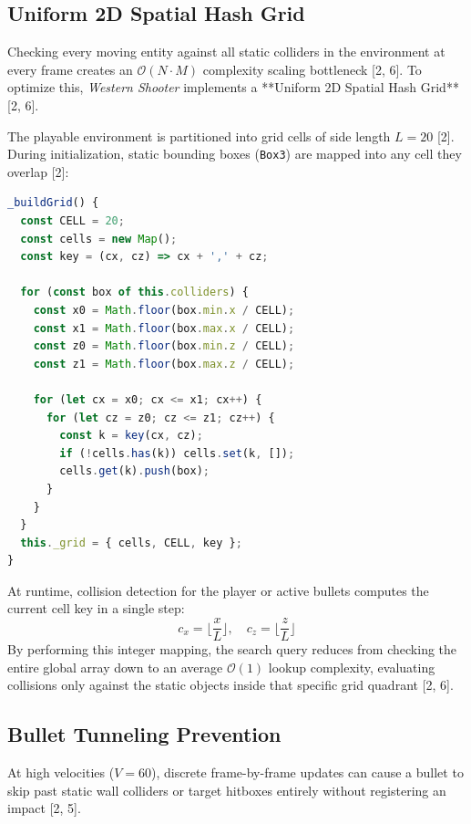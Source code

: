 \documentclass[11pt,a4paper,oneside]{article}
\begin{document}
\subsection{Uniform 2D Spatial Hash Grid}
Checking every moving entity against all static colliders in the environment at every frame creates an $\mathcal{O}(N \cdot M)$ complexity scaling bottleneck [2, 6]. To optimize this, \emph{Western Shooter} implements a **Uniform 2D Spatial Hash Grid** [2, 6].

The playable environment is partitioned into grid cells of side length $L = 20$ [2]. During initialization, static bounding boxes (\texttt{Box3}) are mapped into any cell they overlap [2]:

\begin{lstlisting}[language=JavaScript, caption={Building the grid partition}]
_buildGrid() {
  const CELL = 20;
  const cells = new Map();
  const key = (cx, cz) => cx + ',' + cz;

  for (const box of this.colliders) {
    const x0 = Math.floor(box.min.x / CELL);
    const x1 = Math.floor(box.max.x / CELL);
    const z0 = Math.floor(box.min.z / CELL);
    const z1 = Math.floor(box.max.z / CELL);

    for (let cx = x0; cx <= x1; cx++) {
      for (let cz = z0; cz <= z1; cz++) {
        const k = key(cx, cz);
        if (!cells.has(k)) cells.set(k, []);
        cells.get(k).push(box);
      }
    }
  }
  this._grid = { cells, CELL, key };
}
\end{lstlisting}

At runtime, collision detection for the player or active bullets computes the current cell key in a single step:
\begin{equation}
    c_x = \lfloor \frac{x}{L} \rfloor, \quad c_z = \lfloor \frac{z}{L} \rfloor
\end{equation}
By performing this integer mapping, the search query reduces from checking the entire global array down to an average $\mathcal{O}(1)$ lookup complexity, evaluating collisions only against the static objects inside that specific grid quadrant [2, 6].

\subsection{Bullet Tunneling Prevention}
At high velocities ($V = 60$), discrete frame-by-frame updates can cause a bullet to skip past static wall colliders or target hitboxes entirely without registering an impact [2, 5].
\end{document}
